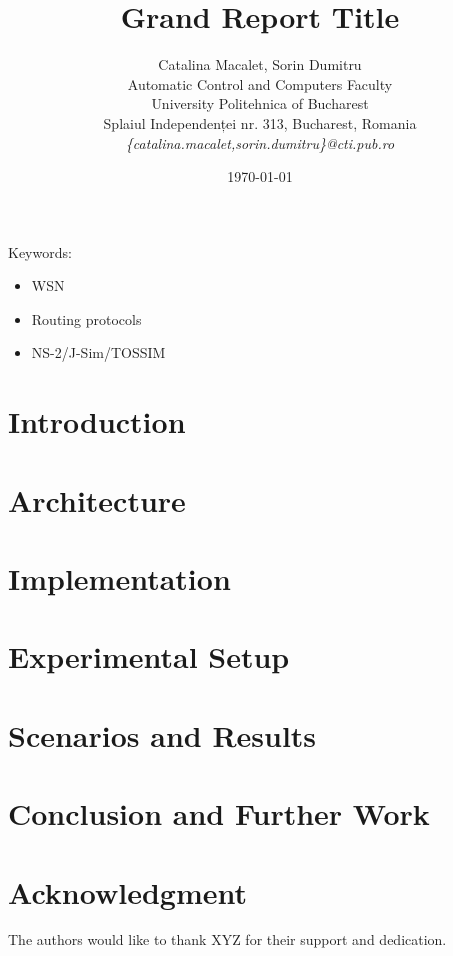 \documentclass[12pt]{article}
\title{Grand Report Title}
\author{Catalina Macalet, Sorin Dumitru\\
Automatic Control and Computers Faculty\\
University Politehnica of Bucharest\\
Splaiul Independenței nr. 313, Bucharest, Romania \\
\emph{\{catalina.macalet,sorin.dumitru\}@cti.pub.ro}}
\date{\today}
\begin{document}
\maketitle

\begin{abstract}

\end{abstract}

Keywords:
\begin{itemize}
  \item WSN
  \item Routing protocols
  \item NS-2/J-Sim/TOSSIM
\end{itemize}

\section{Introduction}
\label{sec:introduction}


\section{Architecture}
\label{sec:architecture}


\section{Implementation}
\label{sec:implementation}


\section{Experimental Setup}
\label{sec:setup}


\section{Scenarios and Results}
\label{sec:results}


\section{Conclusion and Further Work}
\label{sec:conclusion}


\section*{Acknowledgment}
\label{sec:acknowledgment}

The authors would like to thank XYZ for their support and dedication.



\end{document}
